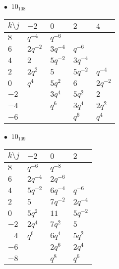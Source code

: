 \begin{minipage}{\linewidth}
$\bullet\ $ $10_{108}$ \vspace{0.5em} \\
\begin{tabular}{l|llll}
$k \setminus j$ & $-2$ & $0$ & $2$ & $4$ \\
\hline
$8$ & $q^{-4}$ & $q^{-6}$ &  &  \\
$6$ & $2q^{-2}$ & $3q^{-4}$ & $q^{-6}$ &  \\
$4$ & $2$ & $5q^{-2}$ & $3q^{-4}$ &  \\
$2$ & $2q^{2}$ & $5$ & $5q^{-2}$ & $q^{-4}$ \\
$0$ & $q^{4}$ & $5q^{2}$ & $6$ & $2q^{-2}$ \\
$-2$ &  & $3q^{4}$ & $5q^{2}$ & $2$ \\
$-4$ &  & $q^{6}$ & $3q^{4}$ & $2q^{2}$ \\
$-6$ &  &  & $q^{6}$ & $q^{4}$ \\
\end{tabular}
\vspace{2em}
\end{minipage}
%
\begin{minipage}{\linewidth}
$\bullet\ $ $10_{109}$ \vspace{0.5em} \\
\begin{tabular}{l|lll}
$k \setminus j$ & $-2$ & $0$ & $2$ \\
\hline
$8$ & $q^{-6}$ & $q^{-8}$ &  \\
$6$ & $2q^{-4}$ & $2q^{-6}$ &  \\
$4$ & $5q^{-2}$ & $6q^{-4}$ & $q^{-6}$ \\
$2$ & $5$ & $7q^{-2}$ & $2q^{-4}$ \\
$0$ & $5q^{2}$ & $11$ & $5q^{-2}$ \\
$-2$ & $2q^{4}$ & $7q^{2}$ & $5$ \\
$-4$ & $q^{6}$ & $6q^{4}$ & $5q^{2}$ \\
$-6$ &  & $2q^{6}$ & $2q^{4}$ \\
$-8$ &  & $q^{8}$ & $q^{6}$ \\
\end{tabular}
\vspace{2em}
\end{minipage}
%
